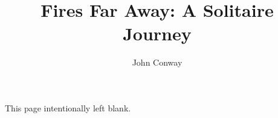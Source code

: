\documentclass[12pt]{article}
\title{Fires Far Away: A Solitaire Journey}
\author{John Conway}
\begin{document}
\newpage 
\thispagestyle{empty}


\newpage

\vspace*{\fill}

\begin{center}
This page intentionally left blank.\\
\ \\
\end{center}

\vspace*{\fill}

\pagebreak

\end{document}
